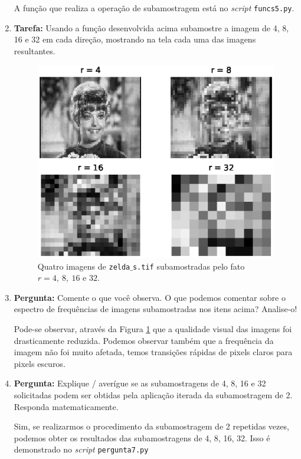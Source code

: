 \documentclass[11pt]{article}
\begin{document}
\begin{enumerate}
A função que realiza a operação de subamostragem está no \textit{script} \texttt{funcs5.py}.

\item \textbf{Tarefa:} Usando a função desenvolvida acima subamostre a imagem de 4, 8, 16 e 32 em cada direção, mostrando na tela cada uma das imagens resultantes. \label{sub_cor_2}

\begin{figure}
	\centering
	\includegraphics[scale=1]{../imgs/zelda_subs.eps}
	\caption{Quatro imagens de \texttt{zelda$\_$s.tif} subamostradas pelo fato $r = 4,~8,~16 \textrm{ e } 32$.}
	\label{fig:subs}
\end{figure}

\item \textbf{Pergunta:} Comente o que você observa. O que podemos comentar sobre o espectro de frequências de imagens subamostradas nos itens acima? Analise-o!
 \label{subcor_perg_1}
 
Pode-se observar, através da Figura \ref{fig:subs} que a qualidade visual das imagens foi drasticamente reduzida. Podemos observar também que a frequência da imagem não foi muito afetada, temos transições rápidas de pixels claros para pixels escuros.

\item \textbf{Pergunta:} Explique / averígue se as subamostragens de 4, 8, 16 e 32 solicitadas podem ser obtidas pela aplicação iterada da subamostragem de 2. Responda matematicamente. \label{subcor_perg_2}

Sim, se realizarmos o procedimento da subamostragem de 2 repetidas vezes, podemos obter os resultados das subamostragens de 4, 8, 16, 32. Isso é demonstrado no \textit{script} \texttt{pergunta7.py}

\end{enumerate}
\end{document}
